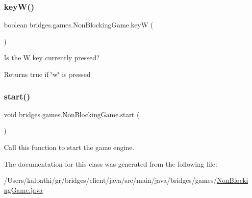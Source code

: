 \subsubsection{\texorpdfstring{key\+W()}{keyW()}}
{\footnotesize\ttfamily boolean bridges.\+games.\+Non\+Blocking\+Game.\+keyW (\begin{DoxyParamCaption}{ }\end{DoxyParamCaption})\hspace{0.3cm}{\ttfamily [protected]}}



Is the W key currently pressed? 

\begin{DoxyReturn}{Returns}
true if \char`\"{}w\char`\"{} is pressed 
\end{DoxyReturn}
\mbox{\label{classbridges_1_1games_1_1_non_blocking_game_ac4df60691641278f139d138c7347674a}} 
\subsubsection{\texorpdfstring{start()}{start()}}
{\footnotesize\ttfamily void bridges.\+games.\+Non\+Blocking\+Game.\+start (\begin{DoxyParamCaption}{ }\end{DoxyParamCaption})}

Call this function to start the game engine. 

The documentation for this class was generated from the following file\+:\begin{DoxyCompactItemize}
\item 
/\+Users/kalpathi/gr/bridges/client/java/src/main/java/bridges/games/\mbox{\hyperlink{_non_blocking_game_8java}{Non\+Blocking\+Game.\+java}}\end{DoxyCompactItemize}

